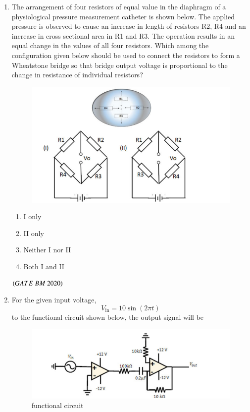 \documentclass[journal,12pt,onecolumn]{IEEEtran}
\theoremstyle{remark}
\begin{document}
\begin{enumerate}
\item The arrangement of four resistors of equal value in the diaphragm of a
physiological pressure measurement catheter is shown below. The applied pressure
is observed to cause an increase in length of resistors R2, R4 and an increase in cross sectional area in R1 and R3. The operation results in an equal change in the values of all four resistors. Which among the configuration given below should be used to connect the resistors to form a Wheatstone bridge so that bridge output voltage is proportional to the change in resistance of individual resistors?\\
\begin{figure}[H]
\centering
\includegraphics[width=0.4\columnwidth]{Figs/fig2.png}
\label{fig:placeholder}
\end{figure}


\begin{enumerate}[label=\alph*)] 
\item\hspace{0.5cm} I only
\item\hspace{0.5cm} II only
\item\hspace{0.5cm} Neither I nor II
\item\hspace{0.5cm} Both I and II
\end{enumerate}
\hfill $\left(GATE\ BM\ 2020\right)$

\item For the given input voltage,\[V_{\text{in}} = 10 \sin\left( 2\pi t \right)
\]to the functional circuit shown below, the output signal will be
\begin{figure}[H]
\centering
\includegraphics[width=0.4\columnwidth]{Figs/fig3.png}
\caption{functional circuit}
\label{fig:placeholder}
\end{figure}


\end{enumerate}
\end{document}
